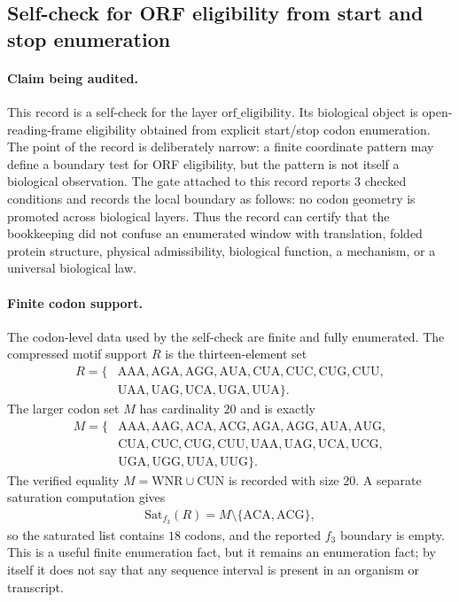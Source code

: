 \subsection{Self-check for ORF eligibility from start and stop enumeration}\label{sec:bioreality-self-claim}

\paragraph{Claim being audited.}
This record is a self-check for the layer $\mathrm{orf\_eligibility}$.  Its biological object is open-reading-frame eligibility obtained from explicit start/stop codon enumeration.  The point of the record is deliberately narrow: a finite coordinate pattern may define a boundary test for ORF eligibility, but the pattern is not itself a biological observation.  The gate attached to this record reports $3$ checked conditions and records the local boundary as follows: no codon geometry is promoted across biological layers.  Thus the record can certify that the bookkeeping did not confuse an enumerated window with translation, folded protein structure, physical admissibility, biological function, a mechanism, or a universal biological law.

\paragraph{Finite codon support.}
The codon-level data used by the self-check are finite and fully enumerated.  The compressed motif support $R$ is the thirteen-element set
$$
\begin{aligned}
R=\{&\mathrm{AAA},\mathrm{AGA},\mathrm{AGG},\mathrm{AUA},\mathrm{CUA},\mathrm{CUC},\mathrm{CUG},\mathrm{CUU},\\
&\mathrm{UAA},\mathrm{UAG},\mathrm{UCA},\mathrm{UGA},\mathrm{UUA}\}.
\end{aligned}
$$
The larger codon set $M$ has cardinality $20$ and is exactly
$$
\begin{aligned}
M=\{&\mathrm{AAA},\mathrm{AAG},\mathrm{ACA},\mathrm{ACG},\mathrm{AGA},\mathrm{AGG},\mathrm{AUA},\mathrm{AUG},\\
&\mathrm{CUA},\mathrm{CUC},\mathrm{CUG},\mathrm{CUU},\mathrm{UAA},\mathrm{UAG},\mathrm{UCA},\mathrm{UCG},\\
&\mathrm{UGA},\mathrm{UGG},\mathrm{UUA},\mathrm{UUG}\}.
\end{aligned}
$$
The verified equality $M=\mathrm{WNR}\cup\mathrm{CUN}$ is recorded with size $20$.  A separate saturation computation gives
$$
\begin{aligned}
\mathrm{Sat}_{f_3}(R)=M\setminus\{\mathrm{ACA},\mathrm{ACG}\},
\end{aligned}
$$
so the saturated list contains $18$ codons, and the reported $f_3$ boundary is empty.  This is a useful finite enumeration fact, but it remains an enumeration fact; by itself it does not say that any sequence interval is present in an organism or transcript.

